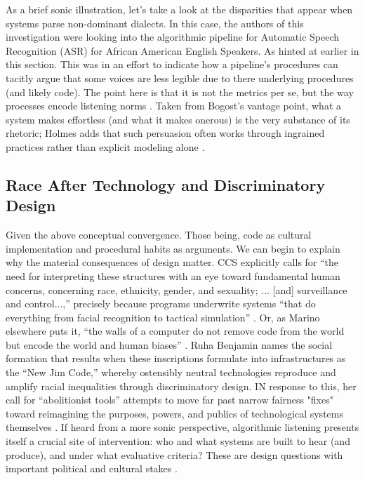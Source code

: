 As a brief sonic illustration, let's take a look at the disparities that appear when systems parse non-dominant dialects. In this case, the authors of this investigation were looking into the algorithmic pipeline for Automatic Speech Recognition (ASR) for African American English Speakers. As hinted at earlier in this section. This was in an effort to indicate how a pipeline’s procedures can tacitly argue that some voices are less legible due to there underlying procedures (and likely code). The point here is that it is not the metrics per se, but the way processes encode listening norms \parencite{Cunningham_etAl_2025}. Taken from Bogost’s vantage point, what a system makes effortless (and what it makes onerous) is the very substance of its rhetoric; Holmes adds that such persuasion often works through ingrained practices rather than explicit modeling alone \parencite{Bogost_2007,Holmes_2017}.

\subsection{Race After Technology and Discriminatory Design}
Given the above conceptual convergence. Those being, code as cultural implementation and procedural habits as arguments. We can begin to explain why the material consequences of design matter. CCS explicitly calls for “the need for interpreting these structures with an eye toward fundamental human concerns, concerning race, ethnicity, gender, and sexuality; ... [and] surveillance and control...,” precisely because programs underwrite systems “that do everything from facial recognition to tactical simulation” \parencite[p.~53]{Marino_2020}. Or, as Marino elsewhere puts it, “the walls of a computer do not remove code from the world but encode the world and human biases” \parencite[p.~33]{Marino_2020}. Ruha Benjamin names the social formation that results when these inscriptions formulate into infrastructures as the “New Jim Code,” whereby ostensibly neutral technologies reproduce and amplify racial inequalities through discriminatory design. IN response to this, her call for “abolitionist tools” attempts to move far past narrow fairness "fixes" toward reimagining the purposes, powers, and publics of technological systems themselves \parencite[154]{Benjamin_2019a}. If heard from  a more sonic perspective, algorithmic listening presents itself a crucial site of intervention: who and what systems are built to hear (and produce), and under what evaluative criteria? These are design questions with important political and cultural stakes \parencite{Franinovic_Serafin_2013}.

